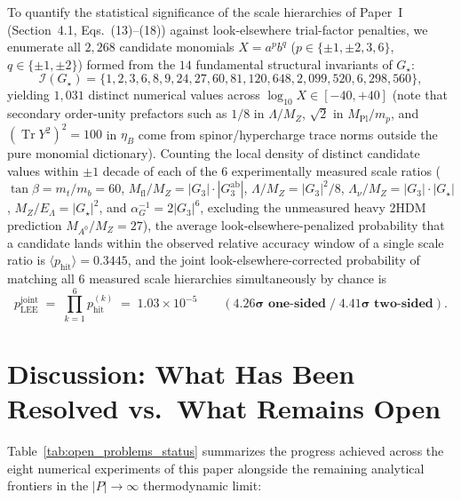 \documentclass[11pt,a4paper]{article}
\theoremstyle{definition}
\theoremstyle{remark}
\newcommand{\Tr}{\operatorname{Tr}}
\newcommand{\Gthree}{G_3}
\newcommand{\Gstar}{G_\star}
\begin{document}
To quantify the statistical significance of the scale hierarchies of Paper~I (Section~4.1, Eqs.~(13)--(18)) against look-elsewhere trial-factor penalties, we enumerate all $2{,}268$ candidate monomials $X = a^p b^q$ ($p \in \{\pm 1, \pm 2, 3, 6\}$, $q \in \{\pm 1, \pm 2\}$) formed from the $14$ fundamental structural invariants of $\Gstar$:
\begin{equation}
\mathcal{I}(\Gstar) = \bigl\{1, 2, 3, 6, 8, 9, 24, 27, 60, 81, 120, 648, 2{,}099{,}520, 6{,}298{,}560\bigr\},
\end{equation}
yielding $1{,}031$ distinct numerical values across $\log_{10} X \in [-40, +40]$ (note that secondary order-unity prefactors such as $1/8$ in $\Lambda/M_Z$, $\sqrt{2}$ in $M_{\mathrm{Pl}}/m_p$, and $(\Tr Y^2)^2 = 100$ in $\eta_B$ come from spinor/hypercharge trace norms outside the pure monomial dictionary). Counting the local density of distinct candidate values within $\pm 1$ decade of each of the $6$ experimentally measured scale ratios ($\tan\beta = m_t/m_b = 60$, $M_{\mathrm{fl}}/M_Z = |\Gthree|\cdot|\Gthree^{\mathrm{ab}}|$, $\Lambda/M_Z = |\Gthree|^2/8$, $\Lambda_\nu/M_Z = |\Gthree|\cdot|\Gstar|$, $M_Z/E_\Lambda = |\Gstar|^2$, and $\alpha_G^{-1} = 2|\Gthree|^6$, excluding the unmeasured heavy 2HDM prediction $M_{A^0}/M_Z = 27$), the average look-elsewhere-penalized probability that a candidate lands within the observed relative accuracy window of a single scale ratio is $\langle p_{\mathrm{hit}}\rangle = 0.3445$, and the joint look-elsewhere-corrected probability of matching all $6$ measured scale hierarchies simultaneously by chance is
\begin{equation}
p_{\mathrm{LEE}}^{\mathrm{joint}} \;=\; \prod_{k=1}^6 p_{\mathrm{hit}}^{(k)} \;=\; 1.03 \times 10^{-5} \qquad (\mathbf{4.26\sigma\text{ one-sided} \; / \; 4.41\sigma\text{ two-sided}}).
\end{equation}

\newpage
\section{Discussion: What Has Been Resolved vs.\ What Remains Open}
\label{sec:conclusion}

Table~\ref{tab:open_problems_status} summarizes the progress achieved across the eight numerical experiments of this paper alongside the remaining analytical frontiers in the $|P| \to \infty$ thermodynamic limit:
\end{document}

